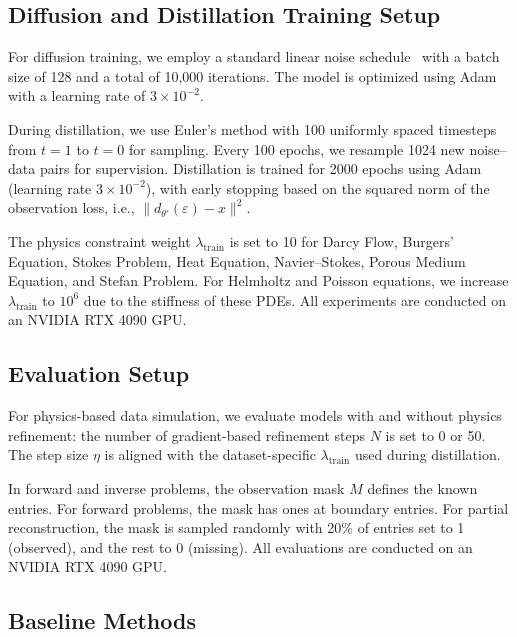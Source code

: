 \documentclass{article}
\theoremstyle{plain}
\theoremstyle{definition}
\theoremstyle{remark}
\begin{document}
\subsection{Diffusion and Distillation Training Setup}

For diffusion training, we employ a standard linear noise schedule~\cite{liu2023rectifiedflow, liu2023flow, lipman2023flow, liu2023instaflow} with a batch size of 128 and a total of 10,000 iterations. The model is optimized using Adam \cite{kingma2014adam} with a learning rate of $3 \times 10^{-2}$.

During distillation, we use Euler’s method with 100 uniformly spaced timesteps from $t = 1$ to $t = 0$ for sampling. Every 100 epochs, we resample 1024 new noise–data pairs for supervision. Distillation is trained for 2000 epochs using Adam (learning rate $3 \times 10^{-2}$), with early stopping based on the squared norm of the observation loss, i.e., $\lVert d_{\theta'}(\varepsilon) - x \rVert^2$.

The physics constraint weight $\lambda_{\text{train}}$ is set to 10 for Darcy Flow, Burgers' Equation, Stokes Problem, Heat Equation, Navier–Stokes, Porous Medium Equation, and Stefan Problem. For Helmholtz and Poisson equations, we increase $\lambda_{\text{train}}$ to $10^6$ due to the stiffness of these PDEs. All experiments are conducted on an NVIDIA RTX 4090 GPU.

\subsection{Evaluation Setup}

For physics-based data simulation, we evaluate models with and without physics refinement: the number of gradient-based refinement steps $N$ is set to 0 or 50. The step size $\eta$ is aligned with the dataset-specific $\lambda_{\text{train}}$ used during distillation.

In forward and inverse problems, the observation mask $M$ defines the known entries. For forward problems, the mask has ones at boundary entries. For partial reconstruction, the mask is sampled randomly with 20\% of entries set to 1 (observed), and the rest to 0 (missing). All evaluations are conducted on an NVIDIA RTX 4090 GPU.

\subsection{Baseline Methods}\label{appendix:baseline}
\end{document}

